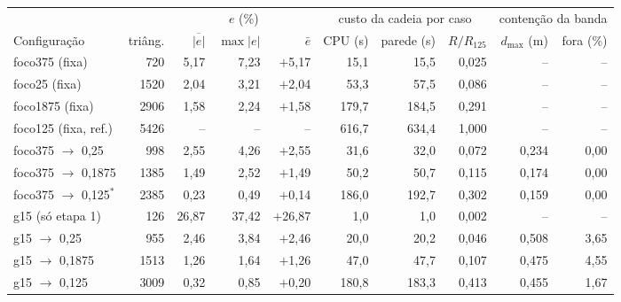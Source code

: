 \begin{tabular}{@{}l r r r r r r r r r@{}}
\toprule
 & & \multicolumn{3}{c}{$e$ (\%)} & \multicolumn{3}{c}{custo da cadeia por caso} & \multicolumn{2}{c}{contenção da banda} \\
\cmidrule(lr){3-5}\cmidrule(lr){6-8}\cmidrule(l){9-10}
Configuração & triâng. & $\overline{|e|}$ & $\max|e|$ & $\bar e$ & CPU (s) & parede (s) & $R/R_{125}$ & $d_{\max}$ (m) & fora (\%) \\
\midrule
foco375 (fixa) & 720 & 5{,}17 & 7{,}23 & $+$5{,}17 & 15{,}1 & 15{,}5 & 0{,}025 & -- & -- \\
foco25 (fixa) & 1520 & 2{,}04 & 3{,}21 & $+$2{,}04 & 53{,}3 & 57{,}5 & 0{,}086 & -- & -- \\
foco1875 (fixa) & 2906 & 1{,}58 & 2{,}24 & $+$1{,}58 & 179{,}7 & 184{,}5 & 0{,}291 & -- & -- \\
foco125 (fixa, ref.) & 5426 & -- & -- & -- & 616{,}7 & 634{,}4 & 1{,}000 & -- & -- \\
\midrule
foco375 $\to$ 0,25 & 998 & 2{,}55 & 4{,}26 & $+$2{,}55 & 31{,}6 & 32{,}0 & 0{,}072 & 0{,}234 & 0{,}00 \\
foco375 $\to$ 0,1875 & 1385 & 1{,}49 & 2{,}52 & $+$1{,}49 & 50{,}2 & 50{,}7 & 0{,}115 & 0{,}174 & 0{,}00 \\
foco375 $\to$ 0,125$^{*}$ & 2385 & 0{,}23 & 0{,}49 & $+$0{,}14 & 186{,}0 & 192{,}7 & 0{,}302 & 0{,}159 & 0{,}00 \\
\midrule
g15 (só etapa 1) & 126 & 26{,}87 & 37{,}42 & $+$26{,}87 & 1{,}0 & 1{,}0 & 0{,}002 & -- & -- \\
g15 $\to$ 0,25 & 955 & 2{,}46 & 3{,}84 & $+$2{,}46 & 20{,}0 & 20{,}2 & 0{,}046 & 0{,}508 & 3{,}65 \\
g15 $\to$ 0,1875 & 1513 & 1{,}26 & 1{,}64 & $+$1{,}26 & 47{,}0 & 47{,}7 & 0{,}107 & 0{,}475 & 4{,}55 \\
g15 $\to$ 0,125 & 3009 & 0{,}32 & 0{,}85 & $+$0{,}20 & 180{,}8 & 183{,}3 & 0{,}413 & 0{,}455 & 1{,}67 \\
\bottomrule
\end{tabular}
